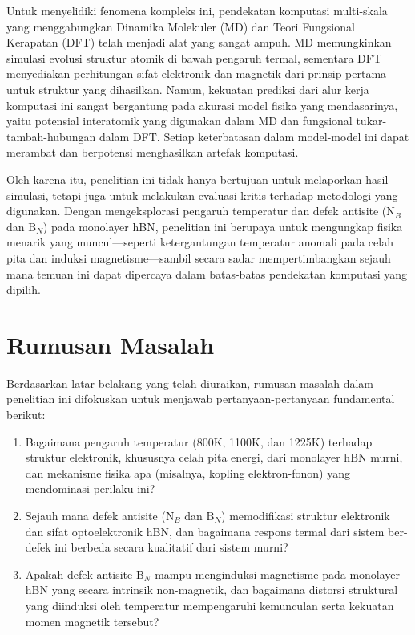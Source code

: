 Untuk menyelidiki fenomena kompleks ini, pendekatan komputasi multi-skala yang menggabungkan Dinamika Molekuler (MD) dan Teori Fungsional Kerapatan (DFT) telah menjadi alat yang sangat ampuh. MD memungkinkan simulasi evolusi struktur atomik di bawah pengaruh termal, sementara DFT menyediakan perhitungan sifat elektronik dan magnetik dari prinsip pertama untuk struktur yang dihasilkan. Namun, kekuatan prediksi dari alur kerja komputasi ini sangat bergantung pada akurasi model fisika yang mendasarinya, yaitu potensial interatomik yang digunakan dalam MD dan fungsional tukar-tambah-hubungan dalam DFT. Setiap keterbatasan dalam model-model ini dapat merambat dan berpotensi menghasilkan artefak komputasi.

Oleh karena itu, penelitian ini tidak hanya bertujuan untuk melaporkan hasil simulasi, tetapi juga untuk melakukan evaluasi kritis terhadap metodologi yang digunakan. Dengan mengeksplorasi pengaruh temperatur dan defek antisite (N$_B$ dan B$_N$) pada monolayer hBN, penelitian ini berupaya untuk mengungkap fisika menarik yang muncul—seperti ketergantungan temperatur anomali pada celah pita dan induksi magnetisme—sambil secara sadar mempertimbangkan sejauh mana temuan ini dapat dipercaya dalam batas-batas pendekatan komputasi yang dipilih.

\section{Rumusan Masalah}
Berdasarkan latar belakang yang telah diuraikan, rumusan masalah dalam penelitian ini difokuskan untuk menjawab pertanyaan-pertanyaan fundamental berikut:
\begin{enumerate}
    \item Bagaimana pengaruh temperatur (800K, 1100K, dan 1225K) terhadap struktur elektronik, khususnya celah pita energi, dari monolayer hBN murni, dan mekanisme fisika apa (misalnya, kopling elektron-fonon) yang mendominasi perilaku ini?
    \item Sejauh mana defek antisite (N$_B$ dan B$_N$) memodifikasi struktur elektronik dan sifat optoelektronik hBN, dan bagaimana respons termal dari sistem ber-defek ini berbeda secara kualitatif dari sistem murni?
    \item Apakah defek antisite B$_N$ mampu menginduksi magnetisme pada monolayer hBN yang secara intrinsik non-magnetik, dan bagaimana distorsi struktural yang diinduksi oleh temperatur mempengaruhi kemunculan serta kekuatan momen magnetik tersebut?
\end{enumerate}

